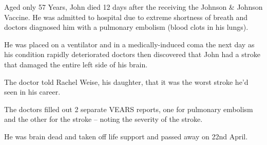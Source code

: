 Aged only 57 Years, John died 12 days after the receiving the Johnson \& Johnson
Vaccine. He was admitted to hospital due to extreme shortness of breath and
doctors diagnosed him with a pulmonary embolism (blood clots in his lungs).

He was placed on a ventilator and in a medically-induced coma the next day as
his condition rapidly deteriorated doctors then discovered that John had a
stroke that damaged the entire left side of his brain.

The doctor told Rachel Weise, his daughter, that it was the worst stroke he’d
seen in his career.

The doctors filled out 2 separate VEARS reports, one for pulmonary embolism and
the other for the stroke – noting the severity of the stroke.

He was brain dead and taken off life support and passed away on 22nd April.

